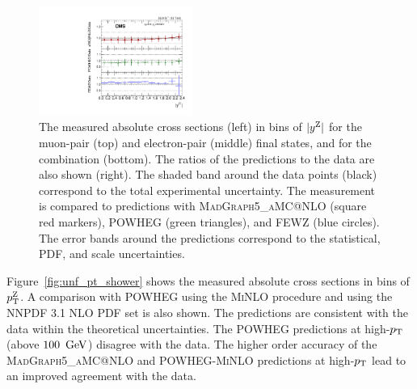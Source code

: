 \begin{figure}
	\includegraphics[width=0.45\textwidth]{figures/zpt/zll_rap_ratio.pdf}
	\caption{The measured absolute cross sections (left) in bins of $|y^{\mathrm{Z}}|$ for the muon-pair (top) and electron-pair (middle) final states, and for the combination (bottom).  The ratios of the predictions to the data are also shown (right). The shaded band around the data points (black) correspond to the total experimental uncertainty. The measurement is compared to predictions with \textsc{MadGraph5\_aMC@NLO} (square red markers), \textsc{POWHEG} (green triangles), and FEWZ (blue circles). The error bands around the predictions correspond to the statistical, PDF, and scale uncertainties.}
	\label{fig:unf_rap}
\end{figure}

Figure~\ref{fig:unf_pt_shower} shows the measured absolute cross sections in 
bins of $ p_{\mathrm{T}}^{\mathrm{Z}}$. 
A comparison with \textsc{POWHEG} using the \textsc{MiNLO} procedure and using the 
NNPDF 3.1 NLO PDF set is also shown. The predictions are consistent with the 
data within the theoretical uncertainties. The \textsc{POWHEG} predictions at 
high-$p_{\mathrm{T}}$ (above $100~\,\text{Ge\hspace{-.08em}V}$) disagree with the data. The higher order 
accuracy of the \textsc{MadGraph5\_aMC@NLO} and \textsc{POWHEG-MiNLO} 
predictions at high-$p_{\mathrm{T}}$ lead to an improved agreement with the data.    

